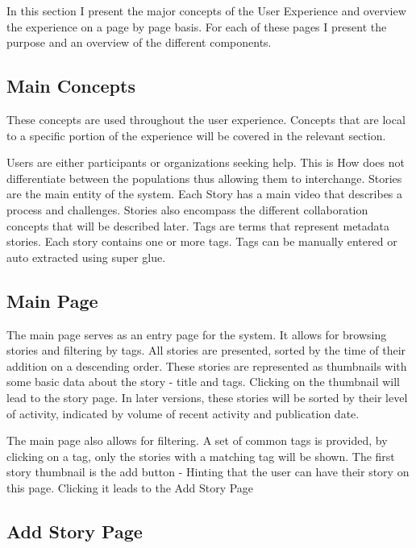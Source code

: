 In this section I present the major concepts of the User Experience and overview the experience on a page by page basis. For each of these pages I present the purpose and an overview of the different components. 

\subsection{Main Concepts}

These concepts are used throughout the user experience. Concepts that are local to a specific portion of the experience will be covered in the relevant section.

Users are either participants or organizations seeking help. This is How does not differentiate between the populations thus allowing them to interchange.
Stories are the main entity of the system. Each Story has a main video that describes a process and challenges. Stories also encompass the different collaboration concepts that will be described later.
Tags are terms that represent metadata stories. Each story contains one or more tags. Tags can be manually entered or auto extracted using super glue. 

\subsection{Main Page}


The main page serves as an entry page for the system. It allows for browsing stories and filtering by tags. All stories are presented, sorted by the time of their addition on a descending order. These stories are represented as thumbnails with some basic data about the story - title and tags. Clicking on the thumbnail will lead to the story page. In later versions, these stories will be sorted by their level of activity, indicated by volume of recent activity and publication date. 

The main page also allows for filtering. A set of common tags is provided, by clicking on a tag, only the stories with a matching tag will be shown. The first story thumbnail is the add button - Hinting that the user can have their story on this page. Clicking it leads to the Add Story Page

\subsection{Add Story Page}

